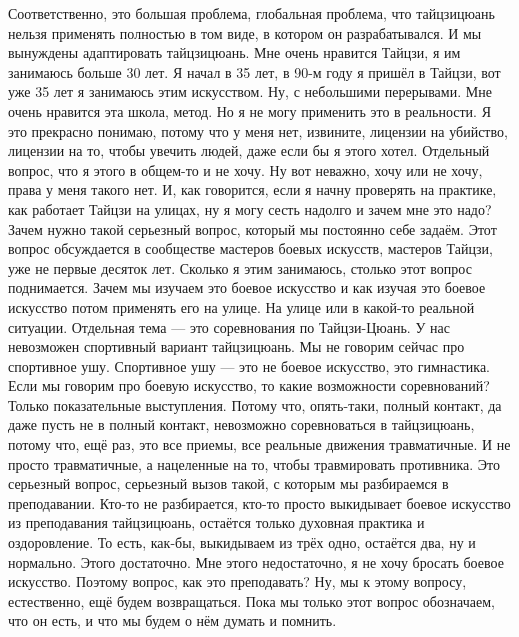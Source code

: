 Соответственно,  
это большая проблема, глобальная проблема, что тайцзицюань
нельзя применять полностью в том виде, в котором 
он разрабатывался. И мы вынуждены адаптировать 
тайцзицюань. Мне очень нравится Тайцзи, я им занимаюсь 
больше 30 лет. Я начал в 35 лет, в 90-м году я пришёл в Тайцзи, 
вот уже 35 лет я занимаюсь этим искусством. Ну, с 
небольшими перерывами. Мне очень нравится эта школа,  
метод. Но я не могу применить это в реальности. Я это 
прекрасно понимаю, потому что у меня нет, извините, 
лицензии на убийство, лицензии на то, чтобы увечить 
людей, даже если бы я этого хотел. Отдельный вопрос, 
что я этого в общем-то и не хочу. Ну вот неважно, хочу 
или не хочу, права у меня такого нет. И, как говорится,  
если я начну проверять на практике, как работает 
Тайцзи на улицах, ну я могу сесть надолго и зачем мне 
это надо? Зачем нужно такой серьезный вопрос, который 
мы постоянно себе задаём. Этот вопрос обсуждается в 
сообществе мастеров боевых искусств, мастеров Тайцзи,
уже не первые десяток лет. Сколько я этим занимаюсь, 
столько этот вопрос поднимается. Зачем мы изучаем 
это боевое искусство и как изучая это боевое 
искусство потом применять его на улице. На улице или в 
какой-то реальной ситуации. Отдельная тема --- это 
соревнования по Тайцзи-Цюань. У нас 
невозможен спортивный вариант тайцзицюань. Мы не 
говорим сейчас про спортивное ушу. Спортивное ушу --- 
это не боевое искусство, это гимнастика. Если мы 
говорим про боевую искусство, то какие возможности 
соревнований? Только показательные выступления.  
Потому что, опять-таки,  полный контакт, да даже пусть 
не в полный контакт, невозможно соревноваться в 
тайцзицюань, потому что, ещё раз, это все приемы, все 
реальные движения травматичные. И не просто
травматичные, а нацеленные на то, чтобы травмировать 
противника. Это серьезный вопрос,  серьезный вызов 
такой, с которым мы разбираемся в преподавании. Кто-то 
не разбирается, кто-то просто выкидывает боевое 
искусство из преподавания тайцзицюань, остаётся 
только духовная практика и оздоровление. То есть, как-бы,
выкидываем из трёх одно, остаётся два, ну и 
нормально. Этого достаточно. Мне этого недостаточно, 
я не хочу бросать боевое искусство. Поэтому вопрос, 
как это преподавать? Ну, мы к этому вопросу, 
естественно, ещё будем возвращаться. Пока мы только 
этот вопрос обозначаем, что он есть, и что мы будем о 
нём думать и помнить.

